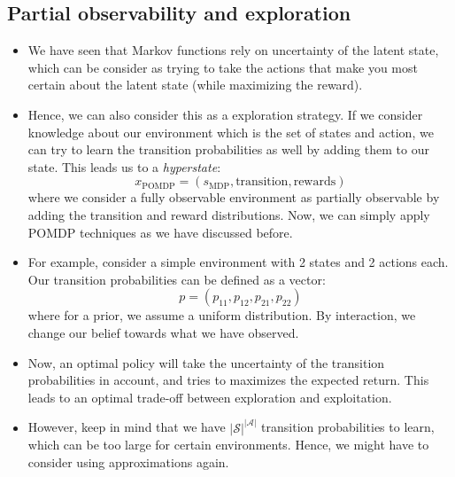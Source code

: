 \subsection{Partial observability and exploration}
\begin{itemize}
	\item We have seen that Markov functions rely on uncertainty of the latent state, which can be consider as trying to take the actions that make you most certain about the latent state (while maximizing the reward).
	\item Hence, we can also consider this as a exploration strategy. If we consider knowledge about our environment which is the set of states and action, we can try to learn the transition probabilities as well by adding them to our state. This leads us to a \textit{hyperstate}:
	$$x_{\text{POMDP}} = (s_{\text{MDP}}, \text{transition}, \text{rewards})$$
	where we consider a fully observable environment as partially observable by adding the transition and reward distributions. Now, we can simply apply POMDP techniques as we have discussed before.
	\item For example, consider a simple environment with 2 states and 2 actions each. Our transition probabilities can be defined as a vector:
	$$p=(p_{11},p_{12},p_{21},p_{22})$$
	where for a prior, we assume a uniform distribution. By interaction, we change our belief towards what we have observed.
	\item Now, an optimal policy will take the uncertainty of the transition probabilities in account, and tries to maximizes the expected return. This leads to an optimal trade-off between exploration and exploitation.
	\item However, keep in mind that we have $|\mathcal{S}|^{|\mathcal{A}|}$ transition probabilities to learn, which can be too large for certain environments. Hence, we might have to consider using approximations again.
\end{itemize}
